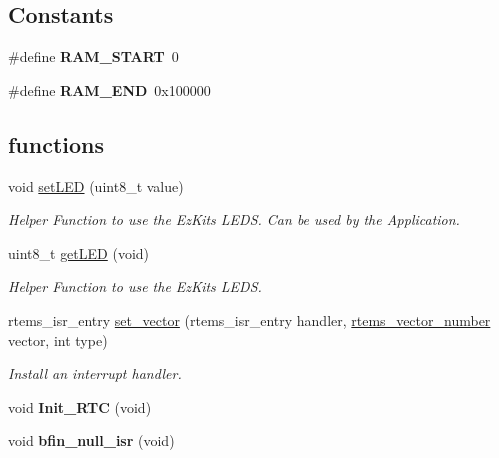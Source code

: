 \subsection*{Constants}
\begin{DoxyCompactItemize}
\item 
\mbox{\label{group__RTEMSBSPsBfinEZKit533_ga2fb476d2a94e0e54f1125306010164a1}} 
\#define {\bfseries R\+A\+M\+\_\+\+S\+T\+A\+RT}~0
\item 
\mbox{\label{group__RTEMSBSPsBfinEZKit533_gacedc86555cbe508b02ba7cae729e64b1}} 
\#define {\bfseries R\+A\+M\+\_\+\+E\+ND}~0x100000
\end{DoxyCompactItemize}
\subsection*{functions}
\begin{DoxyCompactItemize}
\item 
\mbox{\label{group__RTEMSBSPsBfinEZKit533_ga110e01eabf1f71f15a4d12a32778a524}} 
void \mbox{\hyperlink{group__RTEMSBSPsBfinEZKit533_ga110e01eabf1f71f15a4d12a32778a524}{set\+L\+ED}} (uint8\+\_\+t value)
\begin{DoxyCompactList}\small\item\em Helper Function to use the Ez\+Kits L\+E\+DS. Can be used by the Application. \end{DoxyCompactList}\item 
\mbox{\label{group__RTEMSBSPsBfinEZKit533_gacc2474b735b0d5fbf4fdf23a6e385329}} 
uint8\+\_\+t \mbox{\hyperlink{group__RTEMSBSPsBfinEZKit533_gacc2474b735b0d5fbf4fdf23a6e385329}{get\+L\+ED}} (void)
\begin{DoxyCompactList}\small\item\em Helper Function to use the Ez\+Kits L\+E\+DS. \end{DoxyCompactList}\item 
rtems\+\_\+isr\+\_\+entry \mbox{\hyperlink{group__RTEMSBSPsBfinEZKit533_gab3388042c56b34c40be81fd5f028d97e}{set\+\_\+vector}} (rtems\+\_\+isr\+\_\+entry handler, \mbox{\hyperlink{group__ClassicINTR_ga3e434c197d99f128e78cae4d9358bd8b}{rtems\+\_\+vector\+\_\+number}} vector, int type)
\begin{DoxyCompactList}\small\item\em Install an interrupt handler. \end{DoxyCompactList}\item 
\mbox{\label{group__RTEMSBSPsBfinEZKit533_ga715337dfa6294a1b8c668475ccf0b1f2}} 
void {\bfseries Init\+\_\+\+R\+TC} (void)
\item 
\mbox{\label{group__RTEMSBSPsBfinEZKit533_ga8520241d1f72a31de60aa3cefb69a93d}} 
void {\bfseries bfin\+\_\+null\+\_\+isr} (void)
\end{DoxyCompactItemize}


